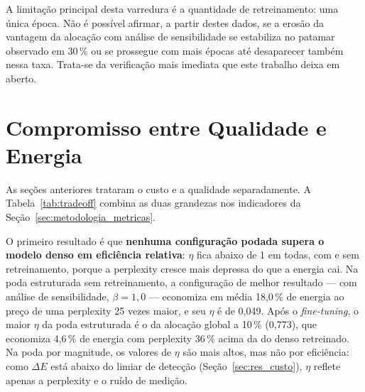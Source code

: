 A limitação principal desta varredura é a quantidade de retreinamento: uma
única época. Não é possível afirmar, a partir destes dados, se a erosão da
vantagem da alocação com análise de sensibilidade se estabiliza no patamar observado em
30\,\% ou se prossegue com mais épocas até desaparecer também nessa taxa. Trata-se da
verificação mais imediata que este trabalho deixa em aberto.

\section{Compromisso entre Qualidade e Energia}\label{sec:res_tradeoff}

As seções anteriores trataram o custo e a qualidade separadamente. A
Tabela~\ref{tab:tradeoff} combina as duas grandezas nos indicadores da
Seção~\ref{sec:metodologia_metricas}.

\begin{table}[htb]
\centering
\caption{Indicadores de compromisso entre qualidade e energia
(Seção~\ref{sec:metodologia_metricas}). Sem retreinamento, cada configuração é resumida
pelas médias de 10\,\% a 50\,\% --- geométrica para a perplexity e aritmética para
$\Delta E$ ---, com $\eta$ calculado a partir delas; $S^*_E$ é a maior taxa com
perplexity até 5\,\% acima da do modelo denso (26,43). Após o \textit{fine-tuning}, os
valores são por configuração, e a referência é o modelo denso retreinado; nenhuma
configuração fica dentro do limite de 5\,\% (19,62). $\beta$ é o expoente de intensidade
da Equação~\ref{eq:alocacao_dev}, que controla o quanto a alocação segue o perfil de
sensibilidade.}
\label{tab:tradeoff}
\small

\end{table}

O primeiro resultado é que \textbf{nenhuma configuração podada supera o modelo denso em
eficiência relativa}: $\eta$ fica abaixo de 1 em todas, com e sem retreinamento, porque a
perplexity cresce mais depressa do que a energia cai. Na poda estruturada sem
retreinamento, a configuração de melhor resultado --- com análise de sensibilidade,
$\beta = 1{,}0$ --- economiza em média 18,0\,\% de energia ao preço de uma perplexity 25
vezes maior, e seu $\eta$ é de 0,049. Após o \textit{fine-tuning}, o maior $\eta$ da poda
estruturada é o da alocação global a 10\,\% (0,773), que economiza 4,6\,\% de energia com
perplexity 36\,\% acima da do denso retreinado. Na poda por magnitude, os valores de
$\eta$ são mais altos, mas não por eficiência: como $\Delta E$ está abaixo do limiar de
detecção (Seção~\ref{sec:res_custo}), $\eta$ reflete apenas a perplexity e o ruído de
medição.

